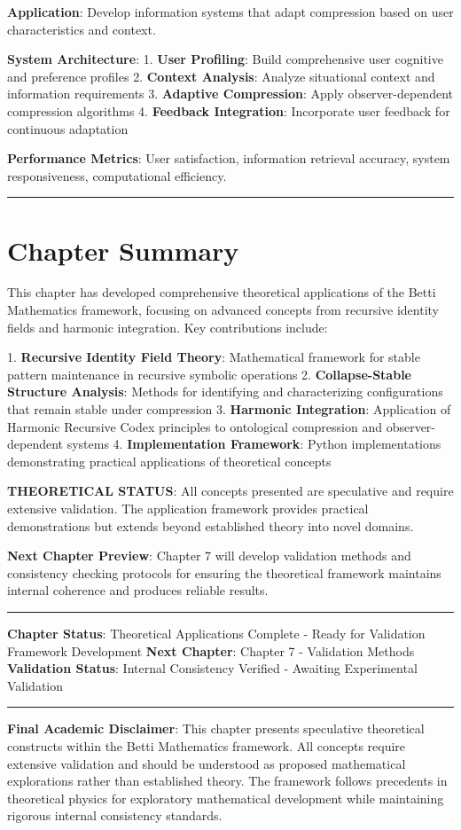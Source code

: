 \textbf{Application}: Develop information systems that adapt compression based on user characteristics and context.

\textbf{System Architecture}:
1. \textbf{User Profiling}: Build comprehensive user cognitive and preference profiles
2. \textbf{Context Analysis}: Analyze situational context and information requirements
3. \textbf{Adaptive Compression}: Apply observer-dependent compression algorithms
4. \textbf{Feedback Integration}: Incorporate user feedback for continuous adaptation

\textbf{Performance Metrics}: User satisfaction, information retrieval accuracy, system responsiveness, computational efficiency.

\hrule

\section{Chapter Summary}

This chapter has developed comprehensive theoretical applications of the Betti Mathematics framework, focusing on advanced concepts from recursive identity fields and harmonic integration. Key contributions include:

1. \textbf{Recursive Identity Field Theory}: Mathematical framework for stable pattern maintenance in recursive symbolic operations
2. \textbf{Collapse-Stable Structure Analysis}: Methods for identifying and characterizing configurations that remain stable under compression
3. \textbf{Harmonic Integration}: Application of Harmonic Recursive Codex principles to ontological compression and observer-dependent systems
4. \textbf{Implementation Framework}: Python implementations demonstrating practical applications of theoretical concepts

\textbf{THEORETICAL STATUS}: All concepts presented are speculative and require extensive validation. The application framework provides practical demonstrations but extends beyond established theory into novel domains.

\textbf{Next Chapter Preview}: Chapter 7 will develop validation methods and consistency checking protocols for ensuring the theoretical framework maintains internal coherence and produces reliable results.

\hrule

\textbf{Chapter Status}: Theoretical Applications Complete - Ready for Validation Framework Development  
\textbf{Next Chapter}: Chapter 7 - Validation Methods  
\textbf{Validation Status}: Internal Consistency Verified - Awaiting Experimental Validation

\hrule

\textbf{Final Academic Disclaimer}: This chapter presents speculative theoretical constructs within the Betti Mathematics framework. All concepts require extensive validation and should be understood as proposed mathematical explorations rather than established theory. The framework follows precedents in theoretical physics for exploratory mathematical development while maintaining rigorous internal consistency standards.